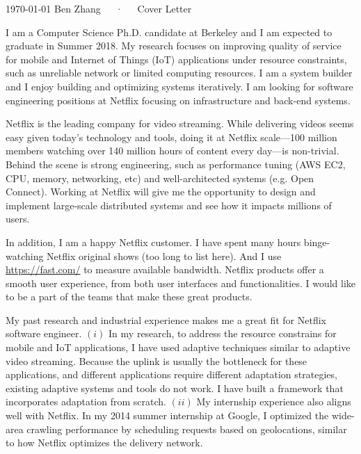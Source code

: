\documentclass[11pt, letterpaper]{awesome-cv}
\begin{document}
\makecvheader[R]
\makecvfooter
  {\today}
  {Ben Zhang~~~·~~~Cover Letter}
  {}

\makelettertitle

\begin{cvletter}


  I am a Computer Science Ph.D. candidate at Berkeley and I am expected to
  graduate in Summer 2018. My research focuses on improving quality of service
  for mobile and Internet of Things (IoT) applications under resource
  constraints, such as unreliable network or limited computing resources. I am a
  system builder and I enjoy building and optimizing systems iteratively. I am
  looking for software engineering positions at Netflix focusing on
  infrastructure and back-end systems.


  Netflix is the leading company for video streaming. While delivering videos
  seems easy given today's technology and tools, doing it at Netflix scale---100
  million members watching over 140 million hours of content every day---is
  non-trivial. Behind the scene is strong engineering, such as performance
  tuning (AWS EC2, CPU, memory, networking, etc) and well-architected systems
  (e.g. Open Connect). Working at Netflix will give me the opportunity to design
  and implement large-scale distributed systems and see how it impacts millions
  of users.

  In addition, I am a happy Netflix customer. I have spent many hours
  binge-watching Netflix original shows (too long to list here). And I use
  \url{https://fast.com/} to measure available bandwidth. Netflix products offer
  a smooth user experience, from both user interfaces and functionalities. I
  would like to be a part of the teams that make these great products.


  My past research and industrial experience makes me a great fit for Netflix
  software engineer. $(i)$ In my research, to address the resource constrains
  for mobile and IoT applications, I have used adaptive techniques similar to
  adaptive video streaming. Because the uplink is usually the bottleneck for
  these applications, and different applications require different adaptation
  strategies, existing adaptive systems and tools do not work. I have built a
  framework that incorporates adaptation from scratch. $(ii)$ My internship
  experience also aligns well with Netflix. In my 2014 summer internship at
  Google, I optimized the wide-area crawling performance by scheduling requests
  based on geolocations, similar to how Netflix optimizes the delivery network.


\end{cvletter}
\end{document}
